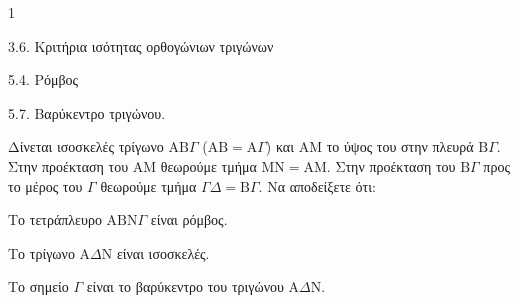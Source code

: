 \begin{ylh}{1}
    \item 3.6. Κριτήρια ισότητας ορθογώνιων τριγώνων
    \item 5.4. Ρόμβος
    \item 5.7. Βαρύκεντρο τριγώνου.
\end{ylh}
Δίνεται ισοσκελές τρίγωνο $\mathrm{A}\mathrm{B}\Gamma$ ($\mathrm{A}\mathrm{B} = \mathrm{A}\Gamma$) και $\mathrm{A}\mathrm{M}$ το ύψος του στην πλευρά $\mathrm{B}\Gamma$. Στην προέκταση του $\mathrm{A}\mathrm{M}$ θεωρούμε τμήμα $\mathrm{M}\mathrm{N} = \mathrm{A}\mathrm{M}$. Στην προέκταση του $\mathrm{B}\Gamma$ προς το μέρος του $\Gamma$ θεωρούμε τμήμα $\Gamma\Delta = \mathrm{B}\Gamma$.
Να αποδείξετε ότι:
\begin{alist}
    \item Το τετράπλευρο $\mathrm{A}\mathrm{B}\mathrm{N}\Gamma$ είναι ρόμβος. 
    \item Το τρίγωνο $\mathrm{A}\Delta\mathrm{N}$ είναι ισοσκελές. 
    \item Το σημείο $\Gamma$ είναι το βαρύκεντρο του τριγώνου $\mathrm{A}\Delta\mathrm{N}$. 
\end{alist}
